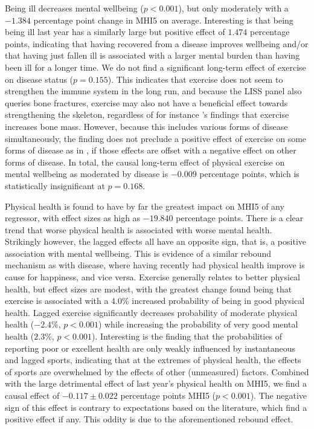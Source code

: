 Being ill decreases mental wellbeing ($p < 0.001$), but only moderately with a $-1.384$ percentage point change
in MHI5 on average.
Interesting is that being being ill last year has a similarly large but positive effect of $1.474$ percentage points,
indicating that having recovered from a disease improves wellbeing and/or that having just fallen ill is associated
with a larger mental burden than having been ill for a longer time.
We do not find a significant long-term effect of exercise on disease status ($p = 0.155$).
This indicates that exercise does not seem to strengthen the immune system in the long run,
and because the LISS panel also queries bone fractures, exercise may also not have a beneficial effect towards
strengthening the skeleton, regardless of for instance 's findings that exercise
increases bone mass.
However, because this includes various forms of disease simultaneously, the finding does not preclude a positive effect of exercise on
some forms of disease as in , if those effects are offset with a negative effect on other forms
of disease.
In total, the causal long-term effect of physical exercise on mental wellbeing as moderated by disease is $-0.009$
percentage points, which is statistically insignificant at $p = 0.168$.

Physical health is found to have by far the greatest impact on MHI5 of any regressor,
with effect sizes as high as $-19.840$ percentage points.
There is a clear trend that worse physical health is associated with worse mental health.
Strikingly however, the lagged effects all have an opposite sign, that is, a positive association with mental wellbeing.
This is evidence of a similar rebound mechanism as with disease, where having recently had physical health improve is
cause for happiness, and vice versa.
Exercise generally relates to better physical health, but effect sizes are modest, with the greatest change found
being that exercise is associated with a 4.0\% increased probability of being in good physical health.
Lagged exercise significantly decreases probability of moderate physical health ($-2.4\%$, $p < 0.001$) while increasing
the probability of very good mental health ($2.3\%$, $p < 0.001$).
Interesting is the finding that the probabilities of reporting poor or excellent health
are only weakly influenced by instantaneous and lagged sports, indicating that at the extremes of physical health,
the effects of sports are overwhelmed by the effects of other (unmeasured) factors.
Combined with the large detrimental effect of last year's physical health on MHI5, we find a causal effect
of $-0.117 \pm 0.022$ percentage points MHI5 ($p < 0.001$). The negative sign of this effect is contrary to expectations based on the
literature, which find a positive effect if any. This oddity is due to the aforementioned rebound effect.

